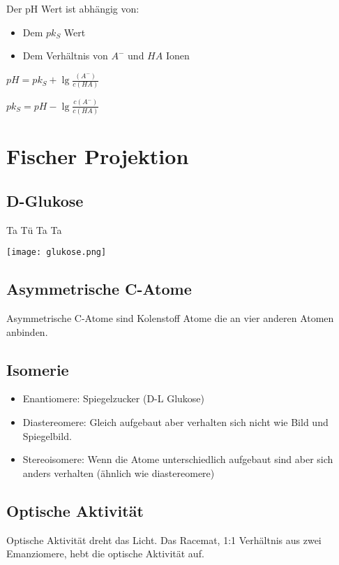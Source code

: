 \documentclass{article}
\begin{document}
Der pH Wert ist abhängig von:

\begin{itemize}
\item Dem $pk_S$ Wert
\item Dem Verhältnis von $A^-$ und $HA$ Ionen
\end{itemize}

$pH = pk_S + \lg{\frac{(A^-)} {c(HA)}}$

$pk_S = pH - \lg{\frac{c(A^-)} {c(HA)}}$

\section*{Fischer Projektion}

\subsection*{D-Glukose}

Ta Tü Ta Ta 

\texttt{[image: glukose.png]}

\subsection*{Asymmetrische C-Atome}

Asymmetrische C-Atome sind Kolenstoff Atome die an vier anderen Atomen anbinden.

\subsection*{Isomerie}
\begin{itemize}
\item Enantiomere: Spiegelzucker (D-L Glukose)
\item Diastereomere: Gleich aufgebaut aber verhalten sich nicht wie Bild und Spiegelbild.
\item Stereoisomere: Wenn die Atome unterschiedlich aufgebaut sind aber sich anders verhalten (ähnlich wie diastereomere)
\end{itemize}

\subsection*{Optische Aktivität}

Optische Aktivität dreht das Licht. Das Racemat, 1:1 Verhältnis aus zwei Emanziomere, hebt die optische Aktivität auf.
\end{document}
